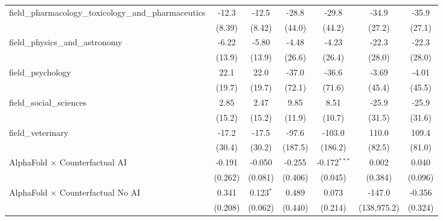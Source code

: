 \begin{tabular}{lcccccc}
   field\_pharmacology\_toxicology\_and\_pharmaceutics         & -12.3        & -12.5         & -28.8         & -29.8          & -34.9          & -35.9\\   
                                                               & (8.39)       & (8.42)        & (44.0)        & (44.2)         & (27.2)         & (27.1)\\   
   field\_physics\_and\_astronomy                              & -6.22        & -5.80         & -4.48         & -4.23          & -22.3          & -22.3\\   
                                                               & (13.9)       & (13.9)        & (26.6)        & (26.4)         & (28.0)         & (28.0)\\   
   field\_psychology                                           & 22.1         & 22.0          & -37.0         & -36.6          & -3.69          & -4.01\\   
                                                               & (19.7)       & (19.7)        & (72.1)        & (71.6)         & (45.4)         & (45.5)\\   
   field\_social\_sciences                                     & 2.85         & 2.47          & 9.85          & 8.51           & -25.9          & -25.9\\   
                                                               & (15.2)       & (15.2)        & (11.9)        & (10.7)         & (31.5)         & (31.6)\\   
   field\_veterinary                                           & -17.2        & -17.5         & -97.6         & -103.0         & 110.0          & 109.4\\   
                                                               & (30.4)       & (30.2)        & (187.5)       & (186.2)        & (82.5)         & (81.0)\\   
   AlphaFold $\times$ Counterfactual AI                        & -0.191       & -0.050        & -0.255        & -0.172$^{***}$ & 0.002          & 0.040\\   
                                                               & (0.262)      & (0.081)       & (0.406)       & (0.045)        & (0.384)        & (0.096)\\   
   AlphaFold $\times$ Counterfactual No AI                     & 0.341        & 0.123$^{*}$   & 0.489         & 0.073          & -147.0         & -0.356\\   
                                                               & (0.208)      & (0.062)       & (0.440)       & (0.214)        & (138,975.2)    & (0.324)\\   

\end{tabular}
